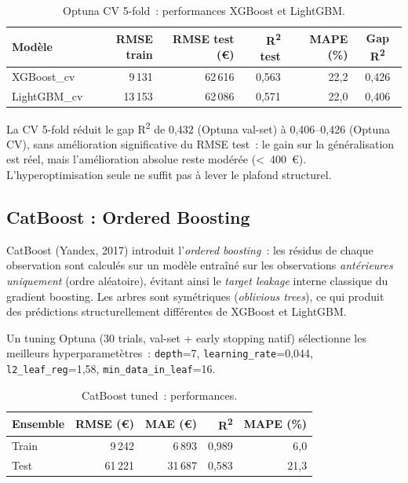 \documentclass[12pt,a4paper]{article}
\begin{document}
\begin{table}[H]
\centering
\caption{Optuna CV 5-fold~: performances XGBoost et LightGBM.}
\label{tab:optuna_cv}
\begin{tabular}{lrrrrc}
\toprule
\textbf{Mod\`ele} & \textbf{RMSE train} & \textbf{RMSE test (\euro)} & \textbf{R\textsuperscript{2} test} & \textbf{MAPE (\%)} & \textbf{Gap R\textsuperscript{2}} \\
\midrule
XGBoost\_cv   & 9\,131 & 62\,616 & 0{,}563 & 22{,}2 & 0{,}426 \\
LightGBM\_cv  & 13\,153 & 62\,086 & 0{,}571 & 22{,}0 & 0{,}406 \\
\bottomrule
\end{tabular}
\end{table}

\begin{descrbox}
La CV 5-fold r\'eduit le gap R\textsuperscript{2} de 0{,}432 (Optuna val-set) \`a 0{,}406--0{,}426 (Optuna CV), sans am\'elioration significative du RMSE test~: le gain sur la g\'en\'eralisation est r\'eel, mais l'am\'elioration absolue reste mod\'er\'ee (\textless~400~\euro). L'hyperoptimisation seule ne suffit pas \`a lever le plafond structurel.
\end{descrbox}

\subsection{CatBoost : Ordered Boosting}

CatBoost (Yandex, 2017) introduit l'\textit{ordered boosting}~: les r\'esidus de chaque observation sont calcul\'es sur un mod\`ele entra\^in\'e sur les observations \textit{ant\'erieures uniquement} (ordre al\'eatoire), \'evitant ainsi le \textit{target leakage} interne classique du gradient boosting. Les arbres sont sym\'etriques (\textit{oblivious trees}), ce qui produit des pr\'edictions structurellement diff\'erentes de XGBoost et LightGBM.

Un tuning Optuna (30 trials, val-set + early stopping natif) s\'electionne les meilleurs hyperparamet\`etres~: \texttt{depth}=7, \texttt{learning\_rate}=0{,}044, \texttt{l2\_leaf\_reg}=1{,}58, \texttt{min\_data\_in\_leaf}=16.

\begin{table}[H]
\centering
\caption{CatBoost tuned~: performances.}
\label{tab:catboost}
\begin{tabular}{lrrrr}
\toprule
\textbf{Ensemble} & \textbf{RMSE (\euro)} & \textbf{MAE (\euro)} & \textbf{R\textsuperscript{2}} & \textbf{MAPE (\%)} \\
\midrule
Train & 9\,242 & 6\,893 & 0{,}989 & 6{,}0 \\
Test  & 61\,221 & 31\,687 & 0{,}583 & 21{,}3 \\
\bottomrule
\end{tabular}
\end{table}
\end{document}
